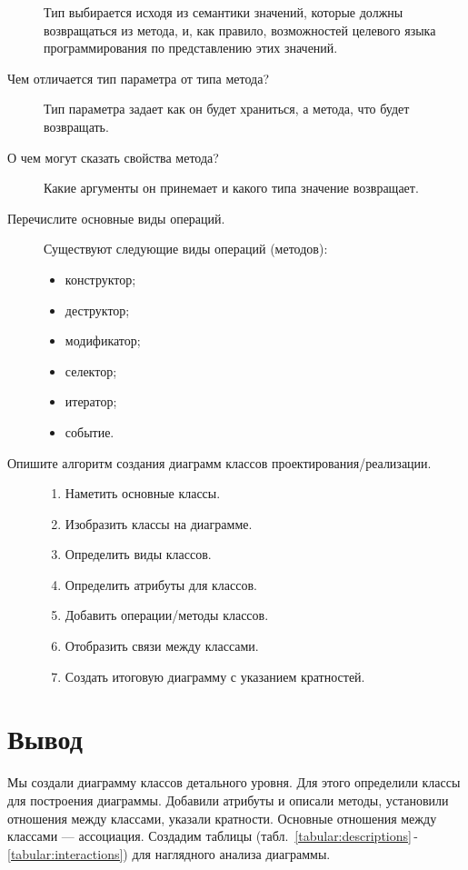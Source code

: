 \begin{description}
		Тип выбирается исходя из семантики значений, которые должны
		возвращаться из метода, и, как правило, возможностей
		целевого языка программирования по представлению этих значений.
	\item [Чем отличается тип параметра от типа метода?]
		Тип параметра задает как он будет храниться, а метода, что будет
		возвращать.
	\item [О чем могут сказать свойства метода?]
		Какие аргументы он принемает и какого типа значение возвращает.
	\item [Перечислите основные виды операций.]
		Существуют следующие виды операций (методов):
		\begin{itemize}
			\item конструктор;
			\item деструктор;
			\item модификатор;
			\item селектор;
			\item итератор;
			\item событие.
		\end{itemize}
	\item [Опишите алгоритм создания диаграмм классов
		проектирования/реализации.]
		\begin{enumerate}
			\item Наметить основные классы.
			\item Изобразить классы на диаграмме.
			\item Определить виды классов.
			\item Определить атрибуты для классов.
			\item Добавить операции/методы классов.
			\item Отобразить связи между классами.
			\item Создать итоговую диаграмму с указанием кратностей.
		\end{enumerate}

\end{description}

\clearpage

\section*{\LARGE Вывод}
Мы создали диаграмму классов детального уровня.
Для этого определили классы для построения диаграммы.
Добавили атрибуты и описали методы, установили отношения между
классами, указали кратности.
Основные отношения между классами --- ассоциация.
Создадим таблицы
(табл.~\ref{tabular:descriptions}\,-\,\ref{tabular:interactions})
для наглядного анализа диаграммы.

